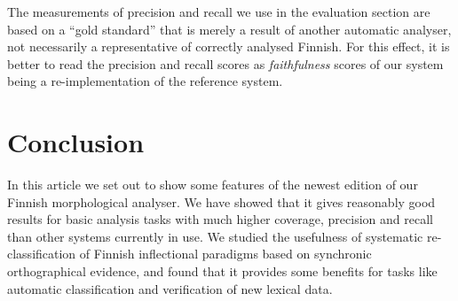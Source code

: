 \documentclass[a4paper,12pt]{article}
\begin{document}
The measurements of precision and recall we use in the evaluation section are
based on a ``gold standard'' that is merely a result of another automatic
analyser, not necessarily a representative of correctly analysed Finnish. For
this effect, it is better to read the precision and recall scores as 
\emph{faithfulness} scores of our system being a re-implementation of the
reference system.

\section{Conclusion}

In this article we set out to show some features of the newest edition of our
Finnish morphological analyser. We have showed that it gives reasonably good
results for basic analysis tasks with much higher coverage, precision and recall
than other systems currently in use. We studied the usefulness of systematic
re-classification of Finnish inflectional paradigms based on synchronic
orthographical evidence, and found that it provides some benefits for tasks
like automatic classification and verification of new lexical data.



\end{document}
